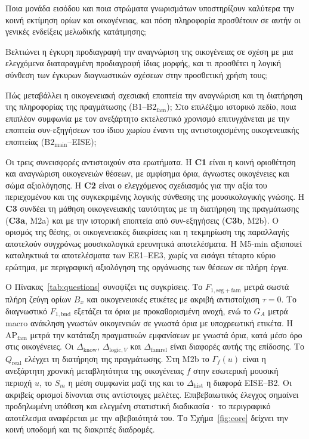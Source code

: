 \documentclass[a4paper]{article}
\newcommand{\dhist}{\ensuremath{\Delta_{\mathrm{hist}}}}
\newcommand{\Qreal}{\ensuremath{Q_{\mathrm{real}}}}
\begin{document}
\begin{description}[leftmargin=0pt,itemsep=1pt,parsep=0pt,font=\normalfont\bfseries]
\item[ΕΕ1 --- Κοινή οριοθέτηση και αναγνώριση (Μ1).] Ποια μονάδα εισόδου και ποια στρώματα γνωρισμάτων υποστηρίζουν καλύτερα την κοινή εκτίμηση ορίων και οικογένειας, και πόση πληροφορία προσθέτουν σε αυτήν οι γενικές ενδείξεις μελωδικής κατάτμησης;
\item[ΕΕ2 --- Περιεχόμενο και μορφή της γνώσης (Α2).] Βελτιώνει η έγκυρη προδιαγραφή την αναγνώριση της οικογένειας σε σχέση με μια ελεγχόμενα διαταραγμένη προδιαγραφή ίδιας μορφής, και τι προσθέτει η λογική σύνθεση των έγκυρων διαγνωστικών σχέσεων στην προσθετική χρήση τους;
\item[ΕΕ3 --- Ταυτότητα, πραγμάτωση και ιστορική εποπτεία (Μ2).] Πώς μεταβάλλει η οικογενειακή σχεσιακή εποπτεία την αναγνώριση και τη διατήρηση της πληροφορίας της πραγμάτωσης (B1--$\mathrm{B2}_{\mathrm{fam}}$); Στο επιλέξιμο ιστορικό πεδίο, ποια επιπλέον συμφωνία με τον ανεξάρτητο εκτελεστικό χρονισμό επιτυγχάνεται με την εποπτεία συν-εξηγήσεων του ίδιου χωρίου έναντι της αντιστοιχισμένης οικογενειακής εποπτείας ($\mathrm{B2}_{\mathrm{main}}$--EISE);
\end{description}

Οι τρεις συνεισφορές αντιστοιχούν στα ερωτήματα. Η \textbf{C1} είναι η κοινή οριοθέτηση και αναγνώριση οικογενειών θέσεων, με αμφίσημα όρια, άγνωστες οικογένειες και σώμα αξιολόγησης. Η \textbf{C2} είναι ο ελεγχόμενος σχεδιασμός για την αξία του περιεχομένου και της συγκεκριμένης λογικής σύνθεσης της μουσικολογικής γνώσης. Η \textbf{C3} συνδέει τη μάθηση οικογενειακής ταυτότητας με τη διατήρηση της πραγμάτωσης (\textbf{C3a}, Μ2a) και με την ιστορική εποπτεία από συν-εξηγήσεις (\textbf{C3b}, Μ2b). Ο ορισμός της θέσης, οι οικογενειακές διακρίσεις και η τεκμηρίωση της παραλλαγής αποτελούν συγχρόνως μουσικολογικά ερευνητικά αποτελέσματα. Η Μ5-min αξιοποιεί καταληκτικά τα αποτελέσματα των ΕΕ1--ΕΕ3, χωρίς να εισάγει τέταρτο κύριο ερώτημα, με περιγραφική αξιολόγηση της οργάνωσης των θέσεων σε πλήρη έργα.

Ο Πίνακας~\ref{tab:questions} συνοψίζει τις συγκρίσεις. Το $F_{1,\mathrm{seg+fam}}$ μετρά σωστά πλήρη ζεύγη ορίων $B_x$ και οικογενειακές ετικέτες με ακριβή αντιστοίχιση $\tau=0$. Το διαγνωστικό $F_{1,\mathrm{bnd}}$ εξετάζει τα όρια με προκαθορισμένη ανοχή, ενώ το $G_A$ μετρά macro ανάκληση γνωστών οικογενειών σε γνωστά όρια με υποχρεωτική ετικέτα. Η $\mathrm{AP}_{\mathrm{fam}}$ μετρά την κατάταξη πραγματικών εμφανίσεων με γνωστά όρια, κατά μέσο όρο στις οικογένειες. Οι $\Delta_{\mathrm{know}}$, $\Delta_{\mathrm{logic},V}$ και $\Delta_{\mathrm{famrel}}$ είναι διαφορές αυτής της επίδοσης. Το $\Qreal$ ελέγχει τη διατήρηση της πραγμάτωσης. Στη Μ2b το $\Gamma_f(u)$ είναι η ανεξάρτητη χρονική μεταβλητότητα της οικογένειας $f$ στην εσωτερική μουσική περιοχή $u$, το $S_m$ η μέση συμφωνία μαζί της και το $\dhist$ η διαφορά EISE--B2. Οι ακριβείς ορισμοί δίνονται στις αντίστοιχες μελέτες. Επιβεβαιωτικός έλεγχος σημαίνει προδηλωμένη υπόθεση και ελεγμένη στατιστική διαδικασία· το περιγραφικό αποτέλεσμα αναφέρεται με την αβεβαιότητά του. Το Σχήμα~\ref{fig:core} δείχνει την κοινή υποδομή και τις διακριτές διαδρομές.
\end{document}
